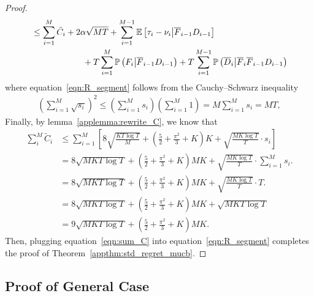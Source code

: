 \documentclass[twoside]{article}
\def\eqref#1{equation~\ref{#1}}
\newcommand{\E}{\mathbb{E}}
\theoremstyle{plain}
\theoremstyle{definition}
\theoremstyle{remark}
\begin{document}
\begin{proof}
\begin{subequations}
\begin{align}
            & \leq \sum^{M}_{i=1}\tilde{C}_{i}+2\alpha\sqrt{MT}+\sum^{M-1}_{i=1}\E\left[\tau_{i}-\nu_{i}\middle| \overline{F}_{i-1}D_{i-1}\right]\label{eqn:R_segment}\\
            &\hspace{+60pt}+T\sum^{M}_{i=1}\mathbb{P}\left(F_{i}\middle| \overline{F}_{i-1}D_{i-1}\right)+T\sum^{M-1}_{i=1}\mathbb{P}\left(\overline{D}_{i}\middle| \overline{F}_{i}\overline{F}_{i-1}D_{i-1}\right)
        \end{align}
    \end{subequations}
    where \eqref{eqn:R_segment} follows from the Cauchy–Schwarz inequality
    \begin{subequations}
        \begin{align}
            \left(\sum^{M}_{i=1}\sqrt{s_{i}}\right)^{2}\leq \left(\sum^{M}_{i=1}s_{i}\right)\left(\sum^{M}_{i=1}1\right)= M\sum^{M}_{i=1}s_{i}= MT,
        \end{align}
    \end{subequations}
    Finally, by lemma~\ref{applemma:rewrite_C}, we know that 
    \begin{subequations}
        \begin{align}
            \sum^{M}_{i}\tilde{C}_{i}&\leq \sum^{M}_{i=1}\left[8\sqrt{\frac{KT\log{T}}{M}}+\left(\frac{5}{2}+\frac{\pi^{2}}{3}+K\right)K+\sqrt{\frac{MK\log{T}}{T}}\cdot s_{i}\right]\\
            &= 8\sqrt{MKT\log{T}}+\left(\frac{5}{2}+\frac{\pi^{2}}{3}+K\right)MK+\sqrt{\frac{MK\log{T}}{T}}\cdot\sum^{M}_{i=1}s_{i}. \label{eqn:to choose Delta}\\
            &=8\sqrt{MKT\log{T}}+\left(\frac{5}{2}+\frac{\pi^{2}}{3}+K\right)MK+\sqrt{\frac{MK\log{T}}{T}}\cdot T.\\
            &=8\sqrt{MKT\log{T}}+\left(\frac{5}{2}+\frac{\pi^{2}}{3}+K\right)MK+\sqrt{MKT\log{T}}\\
            &=9\sqrt{MKT\log{T}}+\left(\frac{5}{2}+\frac{\pi^{2}}{3}+K\right)MK\label{eqn:sum_C}.
        \end{align}
    \end{subequations}
    Then, plugging equation~\ref{eqn:sum_C} into equation~\ref{eqn:R_segment} completes the proof of Theorem~\ref{appthm:std_regret_mucb}.
\end{proof} 


\subsection{Proof of General Case}
\end{document}
